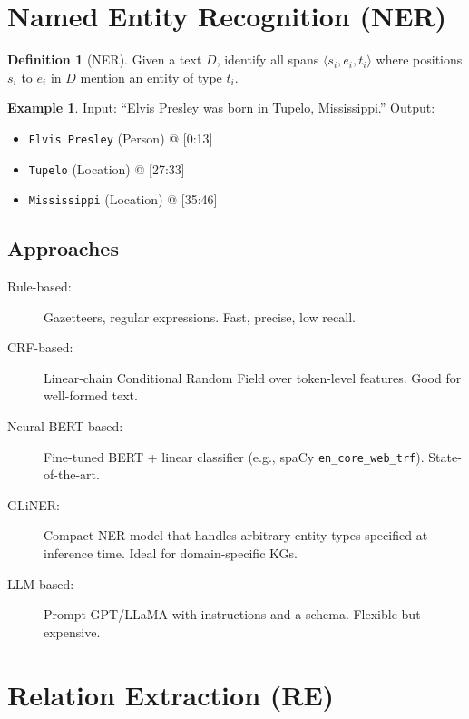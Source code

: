 \documentclass[11pt,a4paper,oneside,openany]{book}
\theoremstyle{definition}
\newtheorem{definition}{Definition}[chapter]
\newtheorem{example}{Example}[chapter]
\theoremstyle{plain}
\theoremstyle{remark}
\begin{document}
\section{Named Entity Recognition (NER)}\label{sec:ner}

\begin{definition}[NER]
	Given a text $D$, identify all spans $\langle s_i, e_i, t_i \rangle$ where positions $s_i$ to $e_i$ in $D$ mention an entity of type $t_i$.
\end{definition}

\begin{example}
	Input: ``Elvis Presley was born in Tupelo, Mississippi.''
	Output:
	\begin{itemize}
		\item \texttt{Elvis Presley} (Person) @ [0:13]
		\item \texttt{Tupelo} (Location) @ [27:33]
		\item \texttt{Mississippi} (Location) @ [35:46]
	\end{itemize}
\end{example}

\subsection{Approaches}

\begin{description}
	\item[Rule-based:] Gazetteers, regular expressions. Fast, precise, low recall.
	\item[CRF-based:] Linear-chain Conditional Random Field over token-level features. Good for well-formed text.
	\item[Neural BERT-based:] Fine-tuned BERT + linear classifier (e.g., spaCy \texttt{en\_core\_web\_trf}). State-of-the-art.
	\item[GLiNER:] Compact NER model that handles arbitrary entity types specified at inference time. Ideal for domain-specific KGs.
	\item[LLM-based:] Prompt GPT/LLaMA with instructions and a schema. Flexible but expensive.
\end{description}

\section{Relation Extraction (RE)}\label{sec:re}
\end{document}
